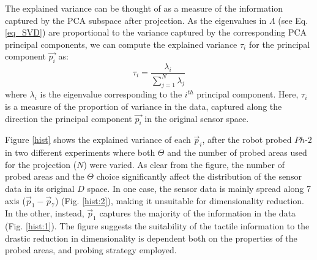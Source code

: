 The explained variance can be thought of as a measure of the information captured by the PCA subspace after projection. 
As the eigenvalues in $\Lambda$ (see Eq. \ref{eq_SVD}) are proportional to the variance captured by the corresponding 
PCA principal components, we can compute the explained variance $\tau_i$ for the principal component $\vec{p_i}$ as:
\begin{equation}
\tau_i=\frac{\lambda_i}{\sum_{j=1}^{N}\lambda_j}
\end{equation}
where $\lambda_i$ is the eigenvalue corresponding to the $i^{th}$ principal component. Here, $\tau_i$ is 
a measure of the proportion of variance in the data, captured along the direction the principal component $\vec{p_i}$ 
in the original sensor space.


Figure \ref{hist} shows the explained variance of each $\vec{p}_i$, after the robot probed $Ph\text{-}2$
in two different experiments where both $\Theta$ and the number of probed areas used for the projection 
($N$) were varied. As clear from the figure, the number of probed areas and the $\Theta$ choice significantly affect the 
distribution of the sensor data in its original $D$ space. In one case, the sensor data is mainly spread along 7 axis 
($\vec{p}_1-\vec{p}_7$) (Fig. \ref{hist:2}), making it unsuitable for dimensionality reduction. In the other, 
instead, $\vec{p}_1$ captures the majority of the information in the data (Fig. \ref{hist:1}). The figure suggests 
the suitability of the tactile information to the drastic reduction in dimensionality is dependent both on the 
properties of the probed areas, and probing strategy employed. %

